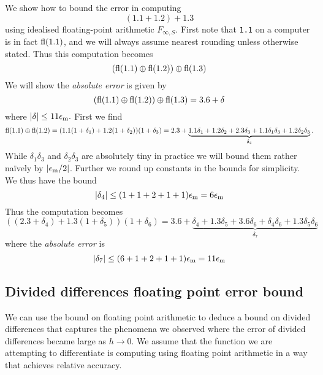 \begin{example} We show how to bound the error in computing
\[
(1.1 + 1.2) + 1.3
\]
using idealised floating-point arithmetic $F_{\ensuremath{\infty},S}$. First note that \texttt{1.1} on a computer is in fact ${\rm fl}(1.1)$, and we will always assume nearest rounding unless otherwise stated. Thus this computation becomes
\[
({\rm fl}(1.1) \ensuremath{\oplus} {\rm fl}(1.2)) \ensuremath{\oplus} {\rm fl}(1.3)
\]
We will show the \emph{absolute error} is given by
\[
({\rm fl}(1.1) \ensuremath{\oplus} {\rm fl}(1.2)) \ensuremath{\oplus} {\rm fl}(1.3) = 3.6 + \ensuremath{\delta}
\]
where $|\ensuremath{\delta}| \ensuremath{\leq}  11 \ensuremath{\epsilon}_{\rm m}.$ First we find
\[
{\rm fl}(1.1) \ensuremath{\oplus} {\rm fl}(1.2) = (1.1(1 + \ensuremath{\delta}_1) + 1.2 (1+\ensuremath{\delta}_2))(1 + \ensuremath{\delta}_3)
 = 2.3 + \underbrace{1.1 \ensuremath{\delta}_1 + 1.2 \ensuremath{\delta}_2 + 2.3 \ensuremath{\delta}_3 + 1.1 \ensuremath{\delta}_1 \ensuremath{\delta}_3 + 1.2 \ensuremath{\delta}_2 \ensuremath{\delta}_3}_{\ensuremath{\delta}_4}.
\]
While $\ensuremath{\delta}_1 \ensuremath{\delta}_3$ and $\ensuremath{\delta}_2 \ensuremath{\delta}_3$ are absolutely tiny in practice we will bound them rather naïvely by $|\ensuremath{\epsilon}_{\rm m}/2|$. Further we round up constants in the bounds for simplicity. We thus have the bound
\[
|\ensuremath{\delta}_4| \ensuremath{\leq} (1+1+2+1+1) \ensuremath{\epsilon}_{\rm m} = 6\ensuremath{\epsilon}_{\rm m}
\]
Thus the computation becomes
\[
((2.3 + \ensuremath{\delta}_4) + 1.3 (1 + \ensuremath{\delta}_5)) (1 + \ensuremath{\delta}_6) = 3.6 + \underbrace{\ensuremath{\delta}_4 + 1.3 \ensuremath{\delta}_5 + 3.6 \ensuremath{\delta}_6 + \ensuremath{\delta}_4 \ensuremath{\delta}_6  + 1.3 \ensuremath{\delta}_5 \ensuremath{\delta}_6}_{\ensuremath{\delta}_7}
\]
where the \emph{absolute error} is
\[
|\ensuremath{\delta}_7| \ensuremath{\leq} (6 + 1 + 2 + 1 + 1) \ensuremath{\epsilon}_{\rm m} = 11 \ensuremath{\epsilon}_{\rm m}
\]
\end{example}

\subsection{Divided differences floating point error bound}
We can use the bound on floating point arithmetic to deduce a bound on divided differences that captures the phenomena we observed where the error of divided differences became large as $h \ensuremath{\rightarrow} 0$. We assume that the function we are attempting to differentiate is computing using floating point arithmetic in a way that achieves relative accuracy. 


